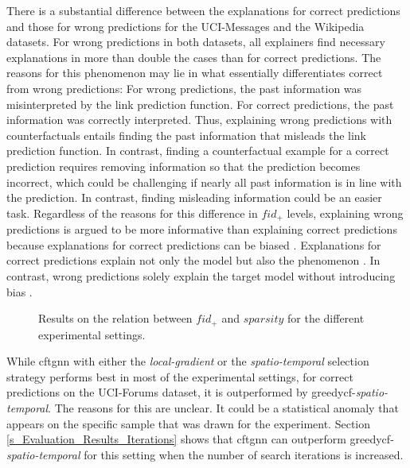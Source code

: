 There is a substantial difference between the explanations for correct predictions and those for wrong predictions for the UCI-Messages and the Wikipedia datasets.
For wrong predictions in both datasets, all explainers find necessary explanations in more than double the cases than for correct predictions. The reasons for this phenomenon may lie in what essentially differentiates correct from wrong predictions: For wrong predictions, the past information was misinterpreted by the link prediction function. For correct predictions, the past information was correctly interpreted. Thus, explaining wrong predictions with counterfactuals entails finding the past information that misleads the link prediction function. In contrast, finding a counterfactual example for a correct prediction requires removing information so that the prediction becomes incorrect, which could be challenging if nearly all past information is in line with the prediction. In contrast, finding misleading information could be an easier task. Regardless of the reasons for this difference in $fid_+$ levels, explaining wrong predictions is argued to be more informative than explaining correct predictions because explanations for correct predictions can be biased \cite{amara_graphframex_2022}. Explanations for correct predictions explain not only the model but also the phenomenon \cite{amara_graphframex_2022}. In contrast, wrong predictions solely explain the target model without introducing bias \cite{amara_graphframex_2022}.

\begin{figure}[ht]
    \centering
    
    \caption{Results on the relation between $fid_+$ and $sparsity$ for the different experimental settings.}
    \label{f_fid_spar}
\end{figure}

While \gls{cftgnn} with either the \textit{local-gradient} or the \textit{spatio-temporal} selection strategy performs best in most of the experimental settings, for correct predictions on the UCI-Forums dataset, it is outperformed by \gls{greedycf}-\textit{spatio-temporal}. The reasons for this are unclear. It could be a statistical anomaly that appears on the specific sample that was drawn for the experiment. Section \ref{s_Evaluation_Results_Iterations} shows that \gls{cftgnn} can outperform \gls{greedycf}-\textit{spatio-temporal} for this setting when the number of search iterations is increased.

